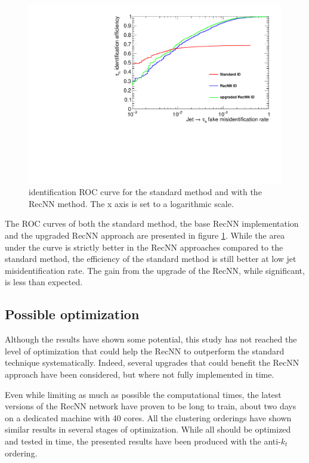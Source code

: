 \begin{figure}
    \centering
    \includegraphics[width=\textwidth]{Images/ROC_comp_all.pdf}
    \caption{\tauh identification ROC curve for the standard method and with the RecNN method. The x axis is set to a logarithmic scale.}
    \label{fig:RecNN_ROC}
\end{figure}

The ROC curves of both the standard method, the base RecNN implementation and the upgraded RecNN approach are presented in figure \ref{fig:RecNN_ROC}. While the area under the curve is strictly better in the RecNN approaches compared to the standard method, the efficiency of the standard method is still better at low jet misidentification rate. The gain from the upgrade of the RecNN, while significant, is less than expected. 


\subsection{Possible optimization}

Although the results have shown some potential, this study has not reached the level of optimization that could help the RecNN to outperform the standard technique systematically. Indeed, several upgrades that could benefit the RecNN approach have been considered, but where not fully implemented in time. 

Even while limiting as much as possible the computational times, the latest versions of the RecNN network have proven to be long to train, about two days on a dedicated machine with 40 cores. All the clustering orderings have shown similar results in several stages of optimization. While all should be optimized and tested in time, the presented results have been produced with the anti-$k_t$ ordering.

